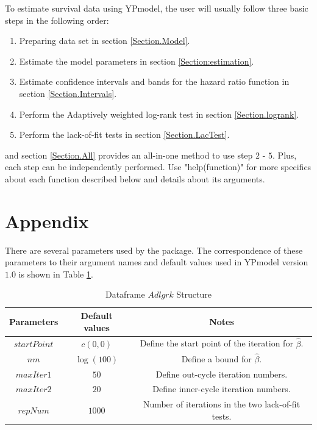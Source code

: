 \documentclass[12pt]{article}
\begin{document}
To estimate survival data using YPmodel, the user will usually follow three
basic steps in the following order:
\begin{enumerate}
  \item Preparing data set in section \ref{Section.Model}.
  \item Estimate the model parameters in section \ref{Section:estimation}.
  \item Estimate confidence intervals and bands for the hazard ratio function in section \ref{Section.Intervals}.
  \item Perform the Adaptively weighted log-rank test in section \ref{Section.logrank}.
  \item Perform the lack-of-fit tests in section \ref{Section.LacTest}.
\end{enumerate}
and section \ref{Section.All} provides an all-in-one method to use step $2$ - $5$. Plus, each step can be independently performed.
Use "help(function)" for more
specifics about each function described below and details about its arguments.

\section{Appendix}

There are several parameters used by the package.
The correspondence of these parameters to their argument names and default values used
in YPmodel version $1.0$ is shown in Table \ref{Tab:Appendix}.

\begin{table}[!h]
\renewcommand{\arraystretch}{1.3}
\caption{Dataframe $Adlgrk$ Structure} \label{Tab:Appendix} \centering
\begin{tabular}{|c||c|c|}
  \hline
  Parameters & Default values & Notes  \\
  \hline
  $startPoint$ & $c(0,0)$ & Define the start point of the iteration for $\hat{\beta}$. \\
  $nm$ & $\log(100)$ & Define a bound for $\hat{\beta}$. \\
  $maxIter1$ & $50$ & Define out-cycle iteration numbers. \\
  $maxIter2$ & $20$ & Define inner-cycle iteration numbers. \\
  $repNum$ & $1000$ & Number of iterations in the two lack-of-fit tests. \\
  \hline
\end{tabular}
\end{table}





\end{document}

